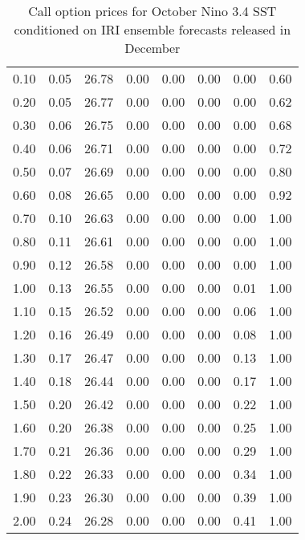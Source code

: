 \begin{table*}[ht]
\begin{tabular}{rrrrrrrr}
  0.10 & 0.05 & 26.78 & 0.00 & 0.00 & 0.00 & 0.00 & 0.60 \\ 
  0.20 & 0.05 & 26.77 & 0.00 & 0.00 & 0.00 & 0.00 & 0.62 \\ 
  0.30 & 0.06 & 26.75 & 0.00 & 0.00 & 0.00 & 0.00 & 0.68 \\ 
  0.40 & 0.06 & 26.71 & 0.00 & 0.00 & 0.00 & 0.00 & 0.72 \\ 
  0.50 & 0.07 & 26.69 & 0.00 & 0.00 & 0.00 & 0.00 & 0.80 \\ 
  0.60 & 0.08 & 26.65 & 0.00 & 0.00 & 0.00 & 0.00 & 0.92 \\ 
  0.70 & 0.10 & 26.63 & 0.00 & 0.00 & 0.00 & 0.00 & 1.00 \\ 
  0.80 & 0.11 & 26.61 & 0.00 & 0.00 & 0.00 & 0.00 & 1.00 \\ 
  0.90 & 0.12 & 26.58 & 0.00 & 0.00 & 0.00 & 0.00 & 1.00 \\ 
  1.00 & 0.13 & 26.55 & 0.00 & 0.00 & 0.00 & 0.01 & 1.00 \\ 
  1.10 & 0.15 & 26.52 & 0.00 & 0.00 & 0.00 & 0.06 & 1.00 \\ 
  1.20 & 0.16 & 26.49 & 0.00 & 0.00 & 0.00 & 0.08 & 1.00 \\ 
  1.30 & 0.17 & 26.47 & 0.00 & 0.00 & 0.00 & 0.13 & 1.00 \\ 
  1.40 & 0.18 & 26.44 & 0.00 & 0.00 & 0.00 & 0.17 & 1.00 \\ 
  1.50 & 0.20 & 26.42 & 0.00 & 0.00 & 0.00 & 0.22 & 1.00 \\ 
  1.60 & 0.20 & 26.38 & 0.00 & 0.00 & 0.00 & 0.25 & 1.00 \\ 
  1.70 & 0.21 & 26.36 & 0.00 & 0.00 & 0.00 & 0.29 & 1.00 \\ 
  1.80 & 0.22 & 26.33 & 0.00 & 0.00 & 0.00 & 0.34 & 1.00 \\ 
  1.90 & 0.23 & 26.30 & 0.00 & 0.00 & 0.00 & 0.39 & 1.00 \\ 
  2.00 & 0.24 & 26.28 & 0.00 & 0.00 & 0.00 & 0.41 & 1.00 \\ 
   \hline
\end{tabular}
\caption{Call option prices for October Nino 3.4 SST conditioned on IRI ensemble forecasts released in December} 
\end{table*}

